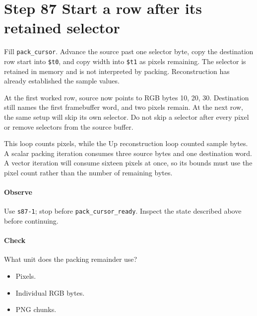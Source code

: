 \section{Step 87 Start a row after its retained selector}
Fill \texttt{pack\_cursor}. Advance the source past one selector byte, copy the destination row start into \texttt{\$t0}, and copy width into \texttt{\$t1} as pixels remaining. The selector is retained in memory and is not interpreted by packing. Reconstruction has already established the sample values.

At the first worked row, source now points to RGB bytes 10, 20, 30. Destination still names the first framebuffer word, and two pixels remain. At the next row, the same setup will skip its own selector. Do not skip a selector after every pixel or remove selectors from the source buffer.

This loop counts pixels, while the Up reconstruction loop counted sample bytes. A scalar packing iteration consumes three source bytes and one destination word. A vector iteration will consume sixteen pixels at once, so its bounds must use the pixel count rather than the number of remaining bytes.

\paragraph{Observe} Use \texttt{s87-1}; stop before \texttt{pack\_cursor\_ready}. Inspect the state described above before continuing.

\paragraph{Check} What unit does the packing remainder use?
\begin{itemize}
\item[A.] Pixels.
\item[B.] Individual RGB bytes.
\item[C.] PNG chunks.
\end{itemize}
